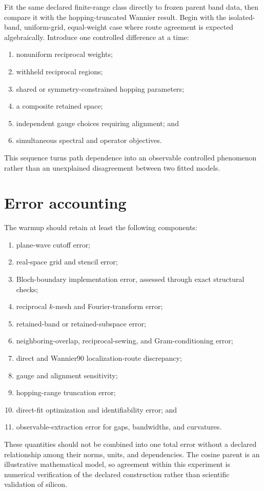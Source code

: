 Fit the same declared finite-range class directly to frozen parent band data,
then compare it with the hopping-truncated Wannier result. Begin with the
isolated-band, uniform-grid, equal-weight case where route agreement is
expected algebraically. Introduce one controlled difference at a time:
\begin{enumerate}
    \item nonuniform reciprocal weights;
    \item withheld reciprocal regions;
    \item shared or symmetry-constrained hopping parameters;
    \item a composite retained space;
    \item independent gauge choices requiring alignment; and
    \item simultaneous spectral and operator objectives.
\end{enumerate}
This sequence turns path dependence into an observable controlled phenomenon
rather than an unexplained disagreement between two fitted models.

\section*{Error accounting}

The warmup should retain at least the following components:
\begin{enumerate}
    \item plane-wave cutoff error;
    \item real-space grid and stencil error;
    \item Bloch-boundary implementation error, assessed through exact
          structural checks;
    \item reciprocal $k$-mesh and Fourier-transform error;
    \item retained-band or retained-subspace error;
    \item neighboring-overlap, reciprocal-sewing, and Gram-conditioning error;
    \item direct and Wannier90 localization-route discrepancy;
    \item gauge and alignment sensitivity;
    \item hopping-range truncation error;
    \item direct-fit optimization and identifiability error; and
    \item observable-extraction error for gaps, bandwidths, and curvatures.
\end{enumerate}
These quantities should not be combined into one total error without a declared
relationship among their norms, units, and dependencies. The cosine parent is
an illustrative mathematical model, so agreement within this experiment is
numerical verification of the declared construction rather than scientific
validation of silicon.

